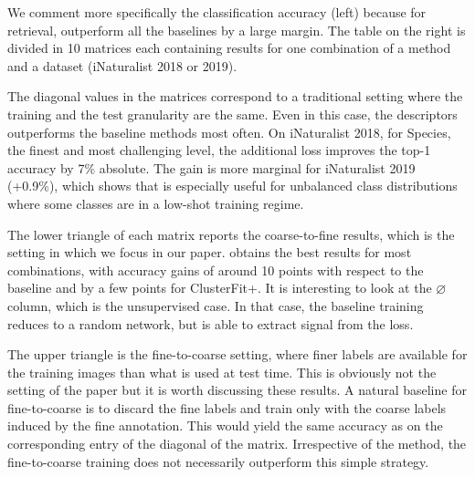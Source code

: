 We comment more specifically the \knn classification accuracy (left) because for retrieval, \ours outperform all the baselines by a large margin. 
The table on the right is divided in 10 matrices each containing results for one combination of a method and a dataset (iNaturalist 2018 or 2019).

The diagonal values in the matrices correspond to a traditional setting where the training and the test granularity are the same.
Even in this case, the \ours descriptors outperforms the baseline methods most often. 
On iNaturalist 2018, for Species, the finest and most challenging level, the additional \ours loss improves the top-1 accuracy by 7\% absolute.
The gain is more marginal for iNaturalist 2019 (+0.9\%), which shows that \ours is especially useful for unbalanced class distributions where some classes are in a low-shot training regime.

The lower triangle of each matrix reports the coarse-to-fine results, which is the setting in which we focus in our paper. 
\ours obtains the best results for most combinations, with accuracy gains of around 10 points with respect to the baseline and by a few points for ClusterFit+. 
It is interesting to look at the $\varnothing$ column, which is the  unsupervised case. 
In that case, the baseline training reduces to a random network, but \ours is able to extract signal from the \knn loss.

The upper triangle is the fine-to-coarse setting, where finer labels are available for the training images than what is used at test time. 
This is obviously not the setting of the paper but it is worth discussing these results. 
A natural baseline for fine-to-coarse is to discard the fine labels and train only with the coarse labels induced by the fine annotation. 
This would yield the same accuracy as on the corresponding entry of the diagonal of the matrix. 
Irrespective of the method, the fine-to-coarse training does not necessarily outperform this simple strategy. 


